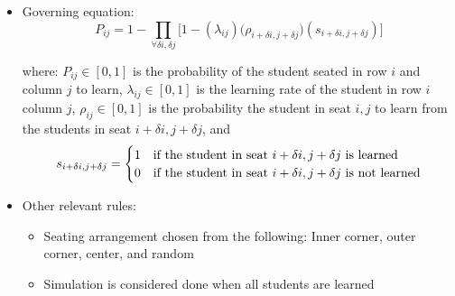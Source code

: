 \begin{itemize}
    \item Governing equation: 
    \begin{equation}
    \label{eq:BPCA PI learning probability}
        P_{ij} = 1 - \prod_{\forall \delta i, \delta j}{\lbrack1-(\lambda_{ij})(\rho_{i+\delta i, j+\delta j}})(s_{i+\delta i, j+\delta j})\rbrack
    \end{equation}

    where:
    \subitem $P_{ij} \in [0,1]$ is the probability of the student seated in row $i$ and column $j$ to learn, 
    \subitem $\lambda_{ij} \in [0,1]$ is the learning rate of the student in row $i$ column $j$, 
    \subitem $\rho_{ij} \in [0,1]$ is the probability the student in seat $i,j$ to learn from the students in seat $i+\delta i, j+\delta j$, and 
    \subitem \begin{equation*}
        s_{i+\delta i, j+\delta j} = \begin{cases}
            1 & \text{if the student in seat $i + \delta i,\space j + \delta j$ is learned} \\
            0 & \text{if the student in seat $i + \delta i,\space j + \delta j$ is not learned}
        \end{cases}
    \end{equation*}

    \item Other relevant rules:
    \begin{itemize}
        \item Seating arrangement chosen from the following: Inner corner, outer corner, center, and random \cite{roxas2010seating}
        \item Simulation is considered done when all students are learned
    \end{itemize}
   
\end{itemize}

